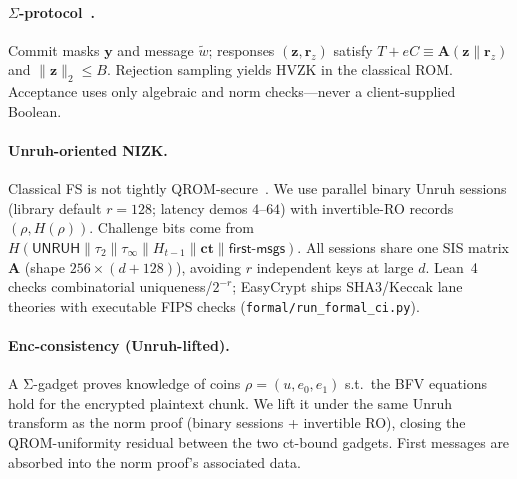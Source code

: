 \documentclass[conference]{IEEEtran}
\newcommand{\norm}[1]{\lVert #1 \rVert}
\begin{document}
\paragraph{$\Sigma$-protocol~\cite{lyubashevsky2012lattice}.}
Commit masks $\mathbf{y}$ and message $\tilde{w}$; responses $(\mathbf{z},\mathbf{r}_z)$ satisfy $T+eC\equiv\mathbf{A}(\mathbf{z}\|\mathbf{r}_z)$ and $\norm{\mathbf{z}}_2\le B$. Rejection sampling yields HVZK in the classical ROM. Acceptance uses only algebraic and norm checks---never a client-supplied Boolean.

\paragraph{Unruh-oriented NIZK.}
Classical FS is not tightly QROM-secure~\cite{kiltz2018qrom}. We use parallel binary Unruh sessions (library default $r{=}128$; latency demos $4$--$64$) with invertible-RO records $(\rho,H(\rho))$. Challenge bits come from $H(\mathsf{UNRUH}\|\tau_2\|\tau_\infty\|H_{t-1}\|\mathbf{ct}\|\mathsf{first\text{-}msgs})$. All sessions share one SIS matrix $\mathbf{A}$ (shape $256{\times}(d{+}128)$), avoiding $r$ independent keys at large $d$. Lean~4 checks combinatorial uniqueness/$2^{-r}$; EasyCrypt ships SHA3/Keccak lane theories with executable FIPS checks (\texttt{formal/run\_formal\_ci.py}).

\paragraph{Enc-consistency (Unruh-lifted).}
A Σ-gadget proves knowledge of coins $\rho=(u,e_0,e_1)$ s.t.\ the BFV equations hold for the encrypted plaintext chunk. We lift it under the same Unruh transform as the norm proof (binary sessions + invertible RO), closing the QROM-uniformity residual between the two ct-bound gadgets. First messages are absorbed into the norm proof's associated data.
\end{document}
